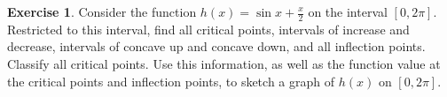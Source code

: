 \documentclass[11pt,reqno,final]{amsart}
\numberwithin{figure}{section}
\theoremstyle{definition} %
\newtheorem{exercise}[question]{Exercise}
\begin{document}
\newpage

\begin{exercise}
        Consider the function $h(x) = \sin x + \frac{x}{2}$ on the interval $[0,2\pi]$.
        Restricted to this interval,
        find all critical points, intervals of increase and decrease, intervals of concave up and concave down, and all inflection points. Classify all critical points.
        Use this information, as well as the function value at the critical points and inflection points,
        to sketch a graph of $h(x)$ on $[0, 2\pi]$.
\end{exercise}
\end{document}

